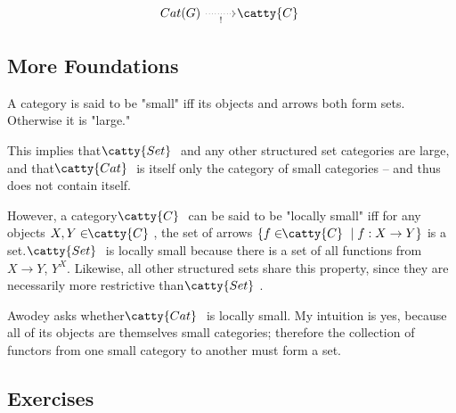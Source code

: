 \documentclass[]{article}
\newcommand{\cdrn}[1]{\arrow[swap,dotted]{r}{#1}}
\newcommand{\cat}[1]{\ensuremath{\!\! \catty{#1} \,\,}}
\begin{document}
$$\begin{tikzcd}
  Cat(G) \cdrn{!} & \cat{C}
\end{tikzcd}$$


\subsection{More Foundations}

A category is said to be "small" iff its objects and arrows both form sets.
Otherwise it is "large."

This implies that \cat{Set} and any other structured set categories are large,
and that \cat{Cat} is itself only the category of small categories -- and thus
does not contain itself.

However, a category \cat{C} can be said to be "locally small" iff for any
objects $X, Y \in \cat{C}$, the set of arrows $\{f \in \cat{C}\;|\;f : X \to Y
\}$ is a set. \cat{Set} is locally small because there is a set of all functions
from $X \to Y$, $Y^X$. Likewise, all other structured sets share this property,
since they are necessarily more restrictive than \cat{Set}.

Awodey asks whether \cat{Cat} is locally small. My intuition is yes, because all
of its objects are themselves small categories; therefore the collection of
functors from one small category to another must form a set.

\subsection{Exercises}
\end{document}
